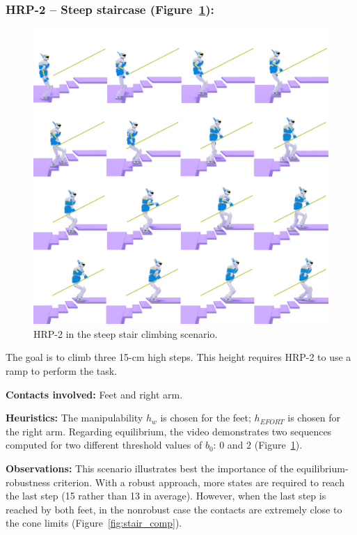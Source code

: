 \subsubsection{HRP-2 -- Steep staircase (Figure~\ref{fig:stair_robust}):}

\begin{figure}
  \centering
  \includegraphics[width=0.5\linewidth]{figures/stair}
  \caption{
           HRP-2 in the steep stair climbing scenario. }
		   \label{fig:stair_robust}
\end{figure}

The goal is to climb three 15-cm high steps. This height requires HRP-2 to use a ramp to perform the task.

\noindent\textbf{Contacts involved:} Feet and right arm.

\noindent\textbf{Heuristics:} The manipulability $h_w$ is chosen for the feet; $h_{EFORT}$ is chosen for the right arm.
Regarding equilibrium, the video demonstrates two sequences computed for two different threshold values of $b_0$: $0$ and $2$ (Figure~\ref{fig:stair_robust}). 

\noindent\textbf{Observations:}
This scenario illustrates best the importance of the equilibrium-robustness criterion.
With a robust approach, more states are required to reach the last step (15 rather than 13 in average).
However, when the last step is reached by both feet, in the nonrobust case the contacts are extremely close to 
the cone limits (Figure~\ref{fig:stair_comp}).


